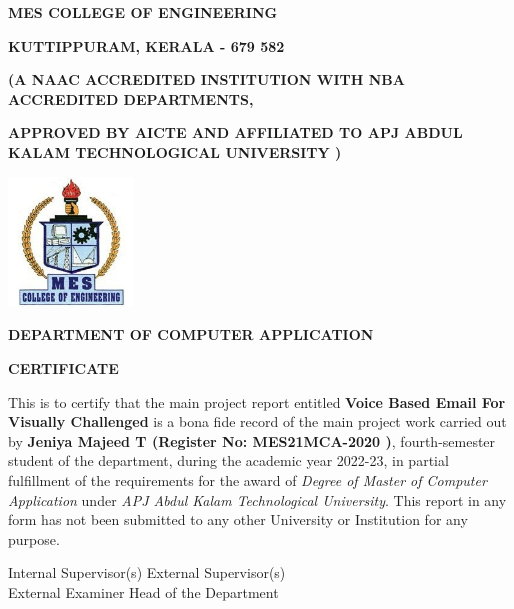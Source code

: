 \documentclass[12pt]{report}
\begin{document}
\begin{titlepage}
    \begin{center}
	{\large\bfseries MES COLLEGE OF ENGINEERING\par}
	{\small\bfseries KUTTIPPURAM, KERALA - 679 582\par}
	{\small\bfseries (A NAAC ACCREDITED INSTITUTION WITH NBA ACCREDITED DEPARTMENTS,\par}
{\small\bfseries APPROVED BY AICTE AND AFFILIATED TO APJ ABDUL KALAM TECHNOLOGICAL UNIVERSITY )\par}
    \vspace{0.5cm}
    \includegraphics[width=0.25\textwidth]{MESCE.jpg}\par\vspace{1cm}
    \vspace{0.5cm}
    {\large\bfseries DEPARTMENT OF COMPUTER APPLICATION\par}
    \vspace{1cm}
    {\large\bfseries CERTIFICATE\par}
    \end{center}
    
    
    This is to certify that the main project report entitled  \textbf{Voice Based Email For Visually Challenged}  is a bona fide record of the main project work carried out by \textbf{Jeniya Majeed T (Register No: MES21MCA-2020 )}, fourth-semester student of the department, during the academic year 2022-23, in partial fulfillment of the requirements for the award of \textit{Degree of Master of Computer Application} under \textit{APJ Abdul Kalam Technological University}. This report in any form has not been submitted to any other University or Institution for any purpose.
    
    \vspace{2cm}
    
   
    Internal Supervisor(s) \hspace{5cm} External Supervisor(s)  \\[0.25cm]  


    
    External Examiner  \hspace{5.5cm}     Head of the Department
    
    
    
    
\end{titlepage}
\end{document}

